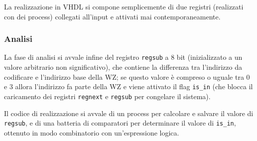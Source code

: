 La realizzazione in VHDL si compone semplicemente di due registri (realizzati con dei process) collegati all'input e attivati mai contemporaneamente.

\subsubsection{Analisi}
La fase di analisi si avvale infine del registro \texttt{regsub} a 8 bit (inizializzato a un valore arbitrario non significativo), che contiene la differenza tra l'indirizzo da codificare e l'indirizzo base della WZ; se questo valore \`e compreso o uguale tra 0 e 3 allora l'indirizzo fa parte della WZ e viene attivato il flag \texttt{is\_in} (che blocca il caricamento dei registri \texttt{regnext} e \texttt{regsub} per congelare il sistema).

Il codice di realizzazione si avvale di un process per calcolare e salvare il valore di \texttt{regsub}, e di una batteria di comparatori per determinare il valore di \texttt{is\_in}, ottenuto in modo combinatorio con un'espressione logica.

